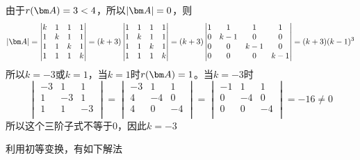 \begin{solution}
    由于$r(\mat{A})=3<4$，所以$|\mat{A}|=0$，则
    \[
        |\mat{A}| =
        \begin{vmatrix}
            k & 1 & 1 & 1 \\
            1 & k & 1 & 1 \\
            1 & 1 & k & 1 \\
            1 & 1 & 1 & k
        \end{vmatrix}
        =(k+3)
        \begin{vmatrix}
            1 & 1 & 1 & 1 \\
            1 & k & 1 & 1 \\
            1 & 1 & k & 1 \\
            1 & 1 & 1 & k
        \end{vmatrix}
        =(k+3)
        \begin{vmatrix}
            1 & 1   & 1   & 1   \\
            0 & k-1 & 0   & 0   \\
            0 & 0   & k-1 & 0   \\
            0 & 0   & 0   & k-1
        \end{vmatrix}
        =(k+3)(k-1)^3
    \]
    所以$k=-3$或$k=1$，当$k=1$时$r(\mat{A})=1$。当$k=-3$时
    \[
        \begin{vmatrix}
            -3 & 1  & 1  \\
            1  & -3 & 1  \\
            1  & 1  & -3 \\
        \end{vmatrix}
        =
        \begin{vmatrix}
            -3 & 1  & 1  \\
            4  & -4 & 0  \\
            4  & 0  & -4 \\
        \end{vmatrix}
        =
        \begin{vmatrix}
            -1 & 1  & 1  \\
            0  & -4 & 0  \\
            0  & 0  & -4 \\
        \end{vmatrix}
        =-16\neq 0
    \]
    所以这个三阶子式不等于$0$，因此$k=-3$
\end{solution}
利用初等变换，有如下解法
